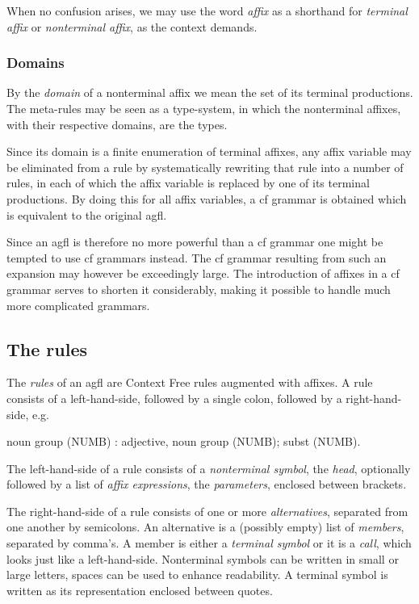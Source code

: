 When no confusion arises, we may use the word {\em affix}
as a shorthand for {\em terminal affix} or {\em nonterminal affix}, as
the context demands.
\subsubsection{Domains}
By the {\em domain} of a nonterminal affix we mean the set of its terminal
productions. The meta-rules may be seen as a type-system, in which the
nonterminal affixes, with their respective domains, are the types.

Since its domain is a finite enumeration of terminal affixes, any
affix variable may be eliminated from a rule by systematically rewriting
that rule into a number of rules, in each of which the affix variable
is replaced by one of its terminal productions. By doing this for
all affix variables, a {\sc cf} grammar is obtained which is equivalent
to the original {\sc agfl}.

Since an {\sc agfl} is therefore no more powerful than a {\sc cf}
grammar one might be tempted to use {\sc cf} grammars instead.
The {\sc cf} grammar
resulting from such an expansion may however be exceedingly large.
The introduction of affixes in a
{\sc cf} grammar serves to shorten it considerably, making it possible
to handle much more complicated grammars.
\subsection{The rules}
The {\em rules} of an {\sc agfl} are Context Free rules augmented with affixes.
A rule consists of a left-hand-side, followed by a single colon, followed by
a right-hand-side, e.g.
\begin{elan}
noun group (NUMB) :
  adjective, noun group (NUMB);
  subst (NUMB).
\end{elan}
The left-hand-side of a rule consists of a
{\em nonterminal symbol}, the {\em head}, optionally followed by a list
of {\em affix expressions}, the {\em parameters}, enclosed between
brackets.

The right-hand-side of a rule consists of one or more {\em alternatives},
separated from one another by semicolons. An alternative is a (possibly
empty) list of {\em members}, separated by comma's. A member is either
a {\em terminal symbol} or it is a {\em call}, which looks just like a
left-hand-side. Nonterminal symbols can be written in small or large letters,
spaces can be used to enhance readability. A terminal symbol is written
as its representation enclosed between quotes.

